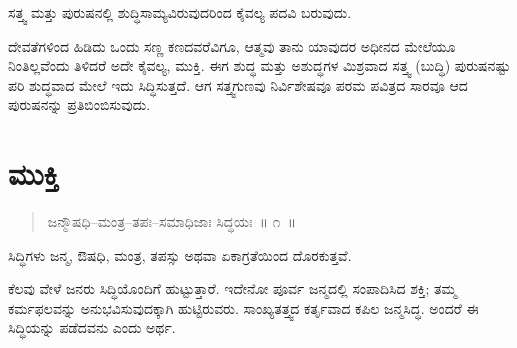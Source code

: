 \vspace{-0.3cm}

ಸತ್ತ್ವ ಮತ್ತು ಪುರುಷನಲ್ಲಿ ಶುದ್ಧಿಸಾಮ್ಯವಿರುವುದರಿಂದ ಕೈವಲ್ಯ ಪದವಿ ಬರುವುದು. 

ದೇವತೆಗಳಿಂದ ಹಿಡಿದು ಒಂದು ಸಣ್ಣ ಕಣದವರೆವಿಗೂ, ಆತ್ಮವು ತಾನು ಯಾವುದರ ಅಧೀನದ ಮೇಲೆಯೂ ನಿಂತಿಲ್ಲವೆಂದು ತಿಳಿದರೆ ಅದೇ ಕೈವಲ್ಯ, ಮುಕ್ತಿ. ಈಗ ಶುದ್ಧ ಮತ್ತು ಅಶುದ್ಧಗಳ ಮಿಶ್ರವಾದ ಸತ್ತ್ವ (ಬುದ್ಧಿ) ಪುರುಷನಷ್ಟು ಪರಿ ಶುದ್ಧವಾದ ಮೇಲೆ ಇದು ಸಿದ್ಧಿಸುತ್ತದೆ. ಆಗ ಸತ್ತ್ವಗುಣವು ನಿರ್ವಿಶೇಷವೂ ಪರಮ ಪವಿತ್ರದ ಸಾರವೂ ಆದ ಪುರುಷನನ್ನು ಪ್ರತಿಬಿಂಬಿಸುವುದು.

\chapter{ಮುಕ್ತಿ}

\begin{verse}
ಜನ್ಮೌಷಧಿ–ಮಂತ್ರ–ತಪಃ–ಸಮಾಧಿಜಾಃ ಸಿದ್ಧಯಃ~॥ ೧~॥
\end{verse}

\vspace{-0.4cm}

ಸಿದ್ಧಿಗಳು ಜನ್ಮ, ಔಷಧಿ, ಮಂತ್ರ, ತಪಸ್ಸು ಅಥವಾ ಏಕಾಗ್ರತೆಯಿಂದ ದೊರಕುತ್ತವೆ. 

ಕೆಲವು ವೇಳೆ ಜನರು ಸಿದ್ಧಿಯೊಂದಿಗೆ ಹುಟ್ಟುತ್ತಾರೆ. ಇದೇನೋ ಪೂರ್ವ ಜನ್ಮದಲ್ಲಿ ಸಂಪಾದಿಸಿದ ಶಕ್ತಿ; ತಮ್ಮ ಕರ್ಮಫಲವನ್ನು ಅನುಭವಿಸುವುದಕ್ಕಾಗಿ ಹುಟ್ಟಿರುವರು. ಸಾಂಖ್ಯತತ್ತ್ವದ ಕರ್ತೃವಾದ ಕಪಿಲ ಜನ್ಮಸಿದ್ಧ. ಅಂದರೆ ಈ ಸಿದ್ಧಿಯನ್ನು ಪಡೆದವನು ಎಂದು ಅರ್ಥ. 

\vskip 4pt

